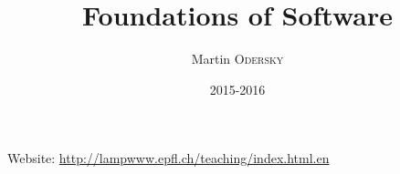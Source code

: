 

\title{Foundations of Software}
\author{Martin \textsc{Odersky}}
\date{2015-2016}


\maketitle
\tableofcontents

\newpage

Website: \url{http://lampwww.epfl.ch/teaching/index.html.en}



\nocite{*}







